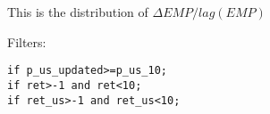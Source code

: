 





\thispagestyle{fancy}

\newcommand{\code}{\texttt}
\newcommand*{\Commonpath}{20190103}

This is the distribution of $\Delta EMP/lag(EMP)$

Filters:

\code{if p\_us\_updated>=p\_us\_10;} \\
\code{if ret>-1 and ret<10;} \\
\code{if ret\_us>-1 and ret\_us<10;} \\





